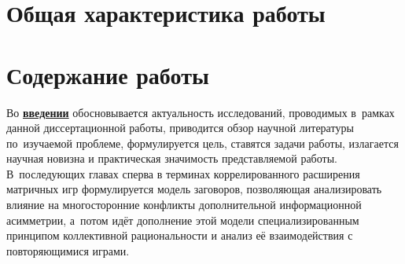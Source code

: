 \section*{Общая характеристика работы}

\newcommand{\actuality}{\pdfbookmark[1]{Актуальность}{actuality}\underline{\textbf{\actualityTXT}}}
\newcommand{\progress}{\pdfbookmark[1]{Разработанность темы}{progress}\underline{\textbf{\progressTXT}}}
\newcommand{\aim}{\pdfbookmark[1]{Цели}{aim}\underline{{\textbf\aimTXT}}}
\newcommand{\tasks}{\pdfbookmark[1]{Задачи}{tasks}\underline{\textbf{\tasksTXT}}}
\newcommand{\aimtasks}{\pdfbookmark[1]{Цели и задачи}{aimtasks}\aimtasksTXT}
\newcommand{\novelty}{\pdfbookmark[1]{Научная новизна}{novelty}\underline{\textbf{\noveltyTXT}}}
\newcommand{\influence}{\pdfbookmark[1]{Практическая значимость}{influence}\underline{\textbf{\influenceTXT}}}
\newcommand{\methods}{\pdfbookmark[1]{Методология и методы исследования}{methods}\underline{\textbf{\methodsTXT}}}
\newcommand{\defpositions}{\pdfbookmark[1]{Положения, выносимые на защиту}{defpositions}\underline{\textbf{\defpositionsTXT}}}
\newcommand{\reliability}{\pdfbookmark[1]{Достоверность}{reliability}\underline{\textbf{\reliabilityTXT}}}
\newcommand{\probation}{\pdfbookmark[1]{Апробация}{probation}\underline{\textbf{\probationTXT}}}
\newcommand{\contribution}{\pdfbookmark[1]{Личный вклад}{contribution}\underline{\textbf{\contributionTXT}}}
\newcommand{\publications}{\pdfbookmark[1]{Публикации}{publications}\underline{\textbf{\publicationsTXT}}}




\section*{Содержание работы}
Во \underline{\textbf{введении}} обосновывается актуальность
исследований, проводимых в~рамках данной диссертационной работы,
приводится обзор научной литературы по~изучаемой проблеме,
формулируется цель, ставятся задачи работы, излагается научная новизна
и практическая значимость представляемой работы. В~последующих главах сперва в терминах коррелированного расширения матричных игр формулируется модель заговоров, позволяющая анализировать влияние на многосторонние конфликты дополнительной информационной асимметрии, а~потом идёт
дополнение этой модели специализированным принципом коллективной рациональности и анализ её взаимодействия с повторяющимися играми.

